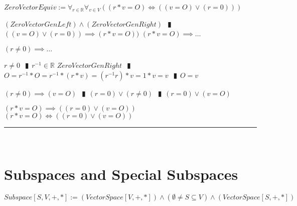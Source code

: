 \documentclass{book}
\newcommand{\abr}{:=}
\newcommand{\pipe}{$\phantom{(}\vrectangleblack\phantom{)}$}
\begin{document}
$ZeroVectorEquiv \abr \forall_{r \in \mathbb{R}} \forall_{v \in V}((r * v = O) \iff ((v = O) \lor (r = 0)))$
\begin{enumerate}
  \lit $(ZeroVectorGenLeft) \land (ZeroVectorGenRight)$ \pipe $((v = O) \lor (r = 0)) \implies (r * v = O))$
  \lit $(r * v = O) \implies \ldots$
  \begin{enumerate}
    \lit $(r \neq 0) \implies \ldots$
      \begin{enumerate}
        \lit $r \neq 0$ \pipe $r^{-1} \in \mathbb{R}$
        \lit $ZeroVectorGenRight$ \pipe $O = r^{-1} * O = r^{-1} * (r * v) = (r^{-1} r) * v = 1 * v = v$ \pipe $O = v$
      \end{enumerate}
      \lit $(r \neq 0) \implies (v = O)$ \pipe $(r = 0) \lor (r \neq 0)$ \pipe $(r = 0) \lor (v = O)$
  \end{enumerate}
  \lit $(r * v = O) \implies ((r = 0) \lor (v = O))$
  \lit $(r * v = O) \iff ((r = 0) \lor (v = O))$
\end{enumerate} \vspace{.75mm} \hrule \vspace{.75mm} \ \\ 

\section{Subspaces and Special Subspaces}
$Subspace[S, V, +, *] \abr (VectorSpace[V, +, *]) \land (\emptyset \neq S \subseteq V) \land (VectorSpace[S, +, *])$ \\
\end{document}
